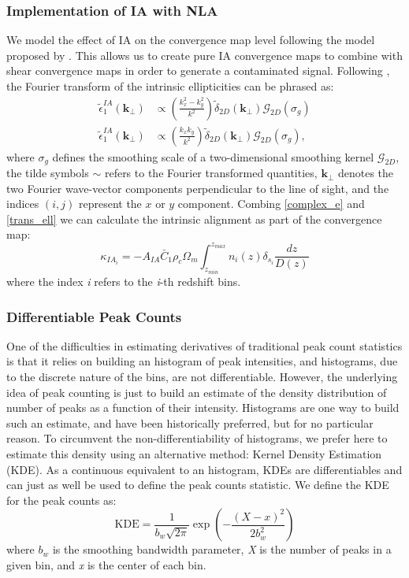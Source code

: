 \documentclass[twocolumn,twocolappendix]{aastex63}
\begin{document}
\subsubsection{Implementation of IA with NLA }
We model the effect of IA on the convergence map level following the model proposed by  \citet{fluri2019cosmological}. This allows us to create pure IA convergence maps to combine with shear convergence maps in order to generate a contaminated signal. 
Following \cite{harnois2021cosmic}, the Fourier transform of the intrinsic ellipticities can be phrased as: 
\begin{align}\label{trans_ell}
    \tilde{ \epsilon}_{1}^{IA}(\textbf{k}_{\bot}) & \propto
    \left ( \frac{k_x^2-k_y^2}{k^2} \right )  \tilde{\delta}_{2D}(\textbf{k}_{\bot})
   \mathcal{G}_{2D}(\sigma_g) \\
       \tilde{ \epsilon}_{1}^{IA}(\textbf{k}_{\bot}) & \propto
    \left ( \frac{k_x k_y}{k^2} \right )  \tilde{\delta}_{2D}(\textbf{k}_{\bot})
   \mathcal{G}_{2D}(\sigma_g), \nonumber
\end{align}
where $\sigma_g$ defines the smoothing scale of a two-dimensional smoothing kernel $\mathcal{G}_{2D}$, the tilde symbols $\sim $ refers to the Fourier transformed quantities, $\textbf{k}_{\bot}$ denotes the two Fourier wave-vector components perpendicular to the line of sight, and the indices $(i,j)$ represent the $x$ or $y$ component.
Combing \autoref{complex_e} and \autoref{trans_ell} we can calculate the intrinsic alignment as part of the convergence map:
\begin{equation}\label{IA_maps}
    \kappa_{IA_{i}}= 
    - A_{IA}\bar{C}_1\rho_c \Omega_m
    \int_{z_{min}}^{z_{max}} 
    n_{i}(z) \delta_{s_{i}}
    \frac{ dz}{D(z)}
\end{equation}
where the index \textit{i} refers to the \textit{i}-th redshift bins.

\subsubsection{Differentiable Peak Counts}
One of the difficulties in estimating derivatives of traditional peak count statistics is that it relies on building
an histogram of peak intensities, and histograms, due to the discrete nature of the bins, are not differentiable. However, the underlying idea of peak counting is just to build an estimate of the density distribution of number of peaks as a function of their intensity. Histograms are one way to build such an estimate, and have been historically preferred, but for no particular reason. To circumvent the non-differentiability of histograms, we prefer here to estimate this density using an alternative method: Kernel Density Estimation (KDE). As a continuous equivalent to an histogram, KDEs are differentiables and can just as well be used to define the peak counts statistic.  
We define the KDE for the peak counts as:
\begin{equation}
   \text{KDE}= \frac{1}{ b_w \sqrt{2\pi}} \exp{\left ( -\frac{(X-x)^2}{2 b_w^2} \right )}
\end{equation}
where $b_w$ is the smoothing bandwidth parameter, \textit{X} is the number of peaks in a given bin, and \textit{x} is the center of each bin.
\end{document}
